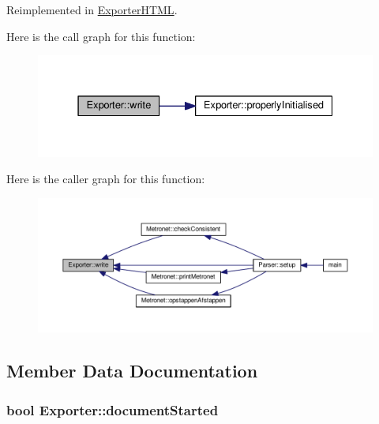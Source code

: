 Reimplemented in \hyperlink{class_exporter_h_t_m_l_ace2649c240282289d4cb3bfbd19e427c}{Exporter\+H\+T\+ML}.



Here is the call graph for this function\+:
\nopagebreak
\begin{figure}[H]
\begin{center}
\leavevmode
\includegraphics[width=331pt]{class_exporter_ab3736803133eb727cf87a7306f91eb11_cgraph}
\end{center}
\end{figure}




Here is the caller graph for this function\+:
\nopagebreak
\begin{figure}[H]
\begin{center}
\leavevmode
\includegraphics[width=350pt]{class_exporter_ab3736803133eb727cf87a7306f91eb11_icgraph}
\end{center}
\end{figure}




\subsection{Member Data Documentation}
\subsubsection[{\texorpdfstring{document\+Started}{documentStarted}}]{\setlength{\rightskip}{0pt plus 5cm}bool Exporter\+::document\+Started\hspace{0.3cm}{\ttfamily [protected]}}\hypertarget{class_exporter_a7d55f6023d5fe983512f6b02fb60733b}{}\label{class_exporter_a7d55f6023d5fe983512f6b02fb60733b}

